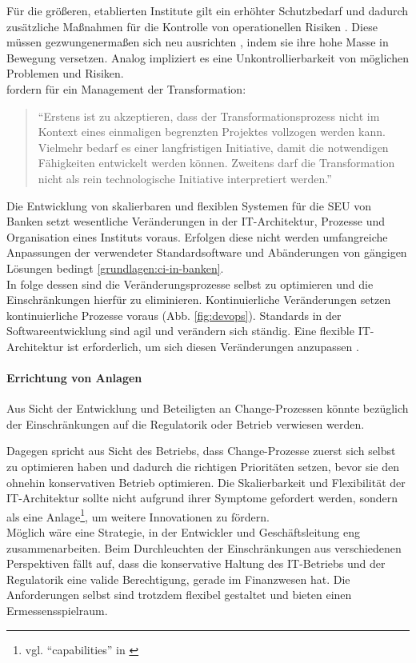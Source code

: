 Für die größeren, etablierten Institute gilt ein erhöhter Schutzbedarf \cite{recht/Bornemann2018} und dadurch zusätzliche Maßnahmen für die Kontrolle von operationellen Risiken \cite{MaRisk:2017, BAIT:2018}. Diese müssen gezwungenermaßen sich neu ausrichten \citet{Bussmann2006, Gupta:2017}, indem sie ihre hohe Masse in Bewegung versetzen. Analog impliziert es eine Unkontrollierbarkeit von möglichen Problemen und Risiken.
\medskip
\\
\citet[11.4.1]{Koch2016} fordern für ein Management der Transformation:
\begin{quote}
    \enquote{Erstens ist zu akzeptieren, dass der
Transformationsprozess nicht im Kontext eines einmaligen begrenzten Projektes vollzogen
werden kann. Vielmehr bedarf es einer langfristigen Initiative, damit die notwendigen
Fähigkeiten entwickelt werden können. Zweitens darf die Transformation nicht als rein
technologische Initiative interpretiert werden.}
\end{quote}

Die Entwicklung von skalierbaren und flexiblen Systemen für die \ac{SEU} von Banken setzt wesentliche Veränderungen in der IT-Architektur, Prozesse und Organisation eines Instituts voraus. Erfolgen diese nicht werden umfangreiche Anpassungen der verwendeter Standardsoftware und Abänderungen von gängigen Lösungen bedingt \ref{grundlagen:ci-in-banken}.
\medskip
\\
In folge dessen sind die Veränderungsprozesse selbst zu optimieren und die Einschränkungen hierfür zu eliminieren. Kontinuierliche Veränderungen setzen kontinuierliche Prozesse voraus (Abb. \ref{fig:devops}). Standards in der Softwareentwicklung sind agil und verändern sich ständig. Eine flexible IT-Architektur ist erforderlich, um sich diesen Veränderungen anzupassen \cite{Bussmann2006}.

\paragraph{Errichtung von Anlagen}
\label{anlagen:capabilities}
Aus Sicht der Entwicklung und Beteiligten an Change-Prozessen könnte bezüglich der Einschränkungen auf die Regulatorik oder Betrieb verwiesen werden.

Dagegen spricht aus Sicht des Betriebs, dass Change-Prozesse zuerst sich selbst zu optimieren haben und dadurch die richtigen Prioritäten setzen, bevor sie den ohnehin konservativen Betrieb optimieren. Die Skalierbarkeit und Flexibilität der IT-Architektur sollte nicht aufgrund ihrer Symptome gefordert werden, sondern als eine Anlage\footnote{vgl. \enquote{capabilities} in \cite{Koch2016}}, um weitere Innovationen zu fördern.
\medskip
\\
Möglich wäre eine Strategie, in der Entwickler und Geschäftsleitung eng zusammenarbeiten.
Beim Durchleuchten der Einschränkungen aus verschiedenen Perspektiven fällt auf, dass die konservative Haltung des IT-Betriebs und der Regulatorik eine valide Berechtigung, gerade im Finanzwesen hat. Die Anforderungen selbst sind trotzdem flexibel gestaltet und bieten einen Ermessensspielraum. 

